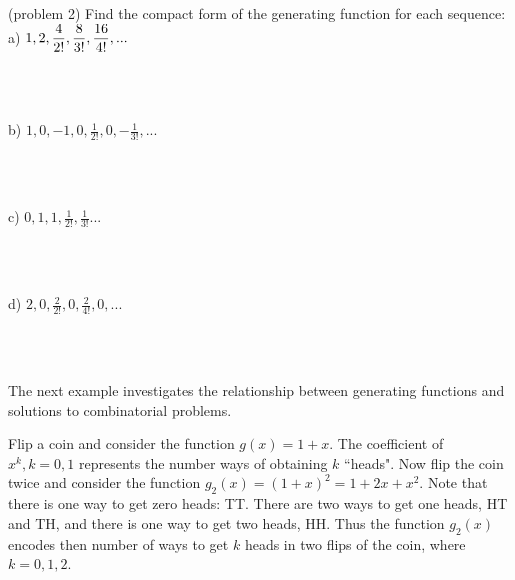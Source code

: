 \documentclass[handout]{ximera}
\begin{document}
\begin{problem}(problem 2)
Find the compact form of the generating function for each sequence:\\
a) $\displaystyle 1, 2, \frac{4}{2!}, \frac{8}{3!}, \frac{16}{4!}, ...$
\begin{multipleChoice}
\\
\\
\end{multipleChoice}
b) $1, 0, -1, 0, \frac{1}{2!}, 0, -\frac{1}{3!}, ...$
\begin{multipleChoice}
\\
\\
\end{multipleChoice}
c) $0, 1, 1, \frac{1}{2!}, \frac{1}{3!} ...$
\begin{multipleChoice}
\\
\\
\end{multipleChoice}
d) $2, 0, \frac{2}{2!}, 0 , \frac{2}{4!}, 0,  ...$
\begin{multipleChoice}
\\
\\
\end{multipleChoice}


\end{problem}



The next example investigates the relationship between generating functions and solutions to combinatorial problems.

\begin{example}[example 3]
Flip a coin and consider the function $g(x) = 1+x$.  The coefficient of $x^k, k = 0,1$ represents the number ways of 
obtaining $k$ ``heads". Now flip the coin twice and consider the function $g_2(x) = (1+x)^2 = 1 + 2x + x^2$.
Note that there is one way to get zero heads: TT. There are two ways to get one heads, HT and TH, 
and there is one way to get two heads, HH. Thus the function $g_2(x)$ encodes then number of ways to 
get $k$ heads in two flips of the coin, 
where $k = 0, 1, 2$.
\end{example}
\end{document}
